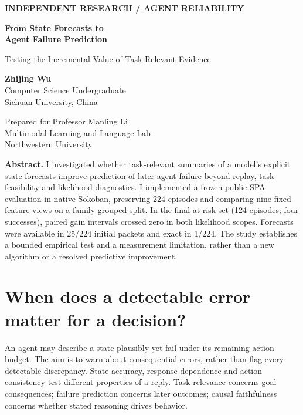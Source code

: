\documentclass[10pt,a4paper]{article}
\newcommand{\eyebrow}[1]{{\small\bfseries\color{blue}\MakeUppercase{#1}}\par\vspace{4pt}}
\newcommand{\callout}[1]{\begingroup\setlength{\fboxsep}{7pt}\colorbox{ice}{\parbox{\dimexpr\linewidth-2\fboxsep}{#1}}\endgroup\par}
\newcommand{\smallbody}{\fontsize{9.5}{11.3}\selectfont}
\begin{document}
\eyebrow{Independent research \quad / \quad Agent reliability}
{\fontsize{20.5}{23}\selectfont\bfseries\color{navy}From State Forecasts to\\Agent Failure Prediction\par}
\vspace{4pt}
{\fontsize{12}{14}\selectfont\color{slate}Testing the Incremental Value of Task-Relevant Evidence\par}
\vspace{10pt}
\begin{minipage}[t]{.48\linewidth}
\textbf{Zhijing Wu}\\
Computer Science Undergraduate\\
Sichuan University, China
\end{minipage}\hfill
\begin{minipage}[t]{.49\linewidth}
\textcolor{slate}{Prepared for Professor Manling Li}\\
Multimodal Learning and Language Lab\\
Northwestern University
\end{minipage}
\vspace{10pt}

\callout{\smallbody\textbf{Abstract.} I investigated whether task-relevant summaries of a model's explicit state forecasts improve prediction of later agent failure beyond replay, task feasibility and likelihood diagnostics. I implemented a frozen public SPA evaluation in native Sokoban, preserving 224 episodes and comparing nine fixed feature views on a family-grouped split. In the final at-risk set (124 episodes; four successes), paired gain intervals crossed zero in both likelihood scopes. Forecasts were available in 25/224 initial packets and exact in 1/224. The study establishes a bounded empirical test and a measurement limitation, rather than a new algorithm or a resolved predictive improvement.}

\section{When does a detectable error matter for a decision?}
An agent may describe a state plausibly yet fail under its remaining action budget. The aim is to warn about consequential errors, rather than flag every detectable discrepancy. State accuracy, response dependence and action consistency test different properties of a reply. Task relevance concerns goal consequences; failure prediction concerns later outcomes; causal faithfulness concerns whether stated reasoning drives behavior.
\end{document}
